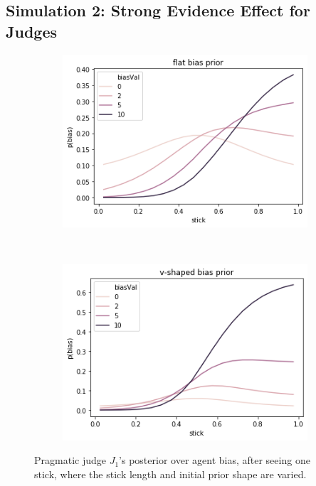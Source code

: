 \documentclass[10pt,letterpaper]{article}
\begin{document}
\subsection{Simulation 2: Strong Evidence Effect for Judges}
\begin{figure}[h]
\centering
\begin{subfigure}{0.45\textwidth}
	\centering
	\includegraphics[width=\textwidth]{figures/seeFlat.png}
\end{subfigure}
~
\begin{subfigure}{0.45\textwidth}
	\centering
	\includegraphics[width=\textwidth]{figures/seeV.png}
\end{subfigure}
\caption{Pragmatic judge $J_1$'s posterior over agent bias, after seeing one stick, where the stick length
and initial prior shape are varied.} 
\label{seeJudge}
\end{figure}
\end{document}
